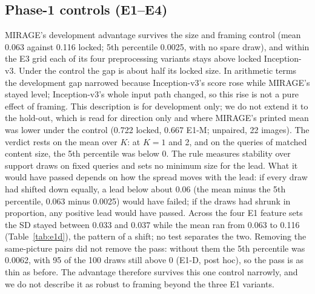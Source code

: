 \documentclass[conference]{IEEEtran}
\begin{document}
\subsection{Phase-1 controls (E1--E4)}
\label{sec:disc-phase1}
MIRAGE's development advantage survives the size and framing control (mean 0.063 against 0.116 locked; 5th percentile 0.0025, with no spare draw), and within the E3 grid each of its four preprocessing variants stays above locked Inception-v3. Under the control the gap is about half its locked size. In arithmetic terms the development gap narrowed because Inception-v3's score rose while MIRAGE's stayed level; Inception-v3's whole input path changed, so this rise is not a pure effect of framing. This description is for development only; we do not extend it to the hold-out, which is read for direction only and where MIRAGE's printed mean was lower under the control (0.722 locked, 0.667 E1-M; unpaired, 22 images). The verdict rests on the mean over $K$: at $K=1$ and 2, and on the queries of matched content size, the 5th percentile was below 0. The rule measures stability over support draws on fixed queries and sets no minimum size for the lead. What it would have passed depends on how the spread moves with the lead: if every draw had shifted down equally, a lead below about 0.06 (the mean minus the 5th percentile, 0.063 minus 0.0025) would have failed; if the draws had shrunk in proportion, any positive lead would have passed. Across the four E1 feature sets the SD stayed between 0.033 and 0.037 while the mean ran from 0.063 to 0.116 (Table~\ref{tab:e1d}), the pattern of a shift; no test separates the two. Removing the same-picture pairs did not remove the pass: without them the 5th percentile was 0.0062, with 95 of the 100 draws still above 0 (E1-D, post hoc), so the pass is as thin as before. The advantage therefore survives this one control narrowly, and we do not describe it as robust to framing beyond the three E1 variants.
\end{document}
